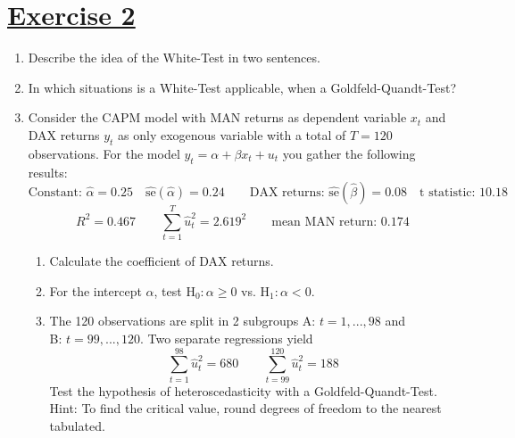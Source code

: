 \documentclass[captions=tableheading, 12pt, headings=small, parskip=half]{scrartcl}
\begin{document}
\section*{\underline{Exercise 2}}
\begin{enumerate}[label = \alph*)]
	\item Describe the idea of the White-Test in two sentences.
	\item In which situations is a White-Test applicable, when a Goldfeld-Quandt-Test?
	\item Consider the CAPM model with MAN returns as dependent variable $x_t$ and DAX returns $y_t$ as only exogenous variable with a total of $T=120$ observations. For the model $y_t = \alpha + \beta x_t + u_t$ you gather the following results:
	\[
	\text{Constant: }\hat{\alpha} = 0.25\quad \widehat{\text{se}}(\hat{\alpha}) = 0.24 \qquad 
	\text{DAX returns: }\widehat{\text{se}}(\hat{\beta}) = 0.08 \quad \text{t statistic: }10.18
	\]\[
	R^2=0.467\qquad \sum_{t = 1}^T{\hat{u}_t^2}=2.619^2 \qquad \text{mean MAN return: }0.174
	\]
	\begin{enumerate}[label = \roman*)]
		\item Calculate the coefficient of DAX returns.
		\item For the intercept $\alpha$, test $\text{H}_0: \alpha \ge 0$ vs. $\text{H}_1: \alpha < 0$.
		\item The 120 observations are split in 2 subgroups A: $t = 1,..., 98$ and\\
		B: $t = 99,...,120$. Two separate regressions yield
		\[\sum_{t = 1}^{98}{\hat{u}_t^2} = 680 \qquad \sum_{t = 99}^{120}{\hat{u}_t^2} = 188\]
		Test the hypothesis of heteroscedasticity with a Goldfeld-Quandt-Test.\\
		Hint: To find the critical value, round degrees of freedom to the nearest tabulated.
	\end{enumerate}
	 
\end{enumerate}
\end{document}
